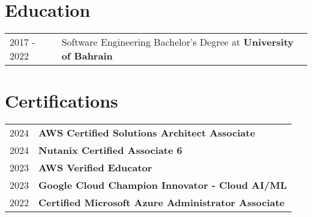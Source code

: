 \documentclass[a4paper,12pt]{article}
\begin{document}
\section{Education}
\begin{tabularx}{\linewidth}{@{}l X@{}}	
2017 - 2022 & Software Engineering Bachelor's Degree at \textbf{University of Bahrain}  \\ 
\end{tabularx}

\section{Certifications}
\begin{tabularx}{\linewidth}{@{}l X@{}}	
2024 & \textbf{AWS Certified Solutions Architect Associate}  \\ 
2024 & \textbf{ Nutanix Certified Associate 6} \\
2023 & \textbf{AWS Verified Educator}  \\ 
2023 & \textbf{Google Cloud Champion Innovator - Cloud AI/ML}  \\ 
2022 & \textbf{Certified Microsoft Azure Administrator Associate}  \\ 


\end{tabularx}
\end{document}
